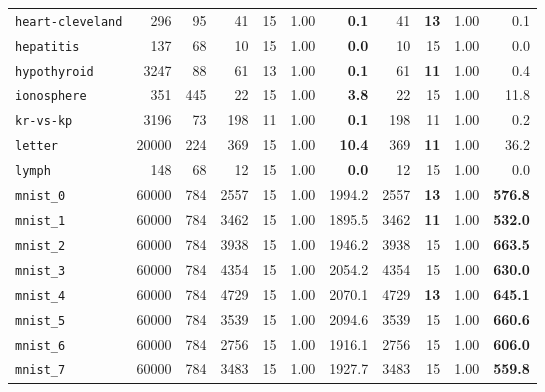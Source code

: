 \begin{tabular}{lccrrrrrrrr}
\texttt{heart-cleveland} & \multicolumn{1}{r}{296} & \multicolumn{1}{r}{95}  & 41 & 15 & 1.00 & \textbf{0.1} & 41 & \textbf{13} & 1.00 & 0.1\\
\texttt{hepatitis} & \multicolumn{1}{r}{137} & \multicolumn{1}{r}{68}  & 10 & 15 & 1.00 & \textbf{0.0} & 10 & 15 & 1.00 & 0.0\\
\texttt{hypothyroid} & \multicolumn{1}{r}{3247} & \multicolumn{1}{r}{88}  & 61 & 13 & 1.00 & \textbf{0.1} & 61 & \textbf{11} & 1.00 & 0.4\\
\texttt{ionosphere} & \multicolumn{1}{r}{351} & \multicolumn{1}{r}{445}  & 22 & 15 & 1.00 & \textbf{3.8} & 22 & 15 & 1.00 & 11.8\\
\texttt{kr-vs-kp} & \multicolumn{1}{r}{3196} & \multicolumn{1}{r}{73}  & 198 & 11 & 1.00 & \textbf{0.1} & 198 & 11 & 1.00 & 0.2\\
\texttt{letter} & \multicolumn{1}{r}{20000} & \multicolumn{1}{r}{224}  & 369 & 15 & 1.00 & \textbf{10.4} & 369 & \textbf{11} & 1.00 & 36.2\\
\texttt{lymph} & \multicolumn{1}{r}{148} & \multicolumn{1}{r}{68}  & 12 & 15 & 1.00 & \textbf{0.0} & 12 & 15 & 1.00 & 0.0\\
\texttt{mnist\_0} & \multicolumn{1}{r}{60000} & \multicolumn{1}{r}{784}  & 2557 & 15 & 1.00 & 1994.2 & 2557 & \textbf{13} & 1.00 & \textbf{576.8}\\
\texttt{mnist\_1} & \multicolumn{1}{r}{60000} & \multicolumn{1}{r}{784}  & 3462 & 15 & 1.00 & 1895.5 & 3462 & \textbf{11} & 1.00 & \textbf{532.0}\\
\texttt{mnist\_2} & \multicolumn{1}{r}{60000} & \multicolumn{1}{r}{784}  & 3938 & 15 & 1.00 & 1946.2 & 3938 & 15 & 1.00 & \textbf{663.5}\\
\texttt{mnist\_3} & \multicolumn{1}{r}{60000} & \multicolumn{1}{r}{784}  & 4354 & 15 & 1.00 & 2054.2 & 4354 & 15 & 1.00 & \textbf{630.0}\\
\texttt{mnist\_4} & \multicolumn{1}{r}{60000} & \multicolumn{1}{r}{784}  & 4729 & 15 & 1.00 & 2070.1 & 4729 & \textbf{13} & 1.00 & \textbf{645.1}\\
\texttt{mnist\_5} & \multicolumn{1}{r}{60000} & \multicolumn{1}{r}{784}  & 3539 & 15 & 1.00 & 2094.6 & 3539 & 15 & 1.00 & \textbf{660.6}\\
\texttt{mnist\_6} & \multicolumn{1}{r}{60000} & \multicolumn{1}{r}{784}  & 2756 & 15 & 1.00 & 1916.1 & 2756 & 15 & 1.00 & \textbf{606.0}\\
\texttt{mnist\_7} & \multicolumn{1}{r}{60000} & \multicolumn{1}{r}{784}  & 3483 & 15 & 1.00 & 1927.7 & 3483 & 15 & 1.00 & \textbf{559.8}\\

\end{tabular}
